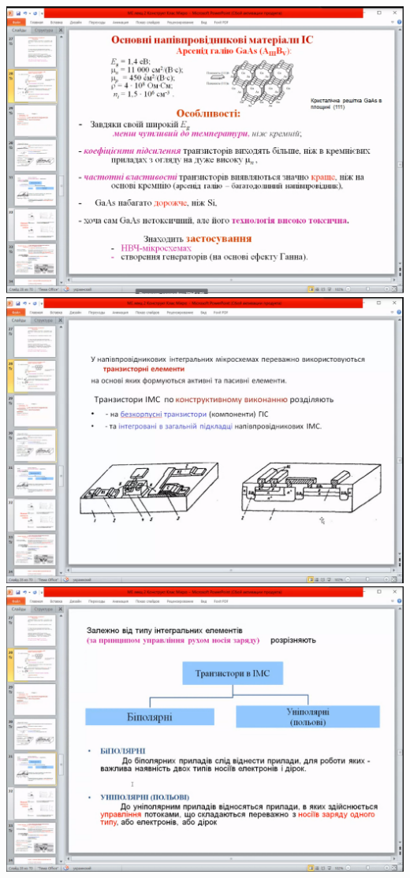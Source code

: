 \documentclass[a4paper,14pt]{extreport}
\begin{document}
\begin{center}
\includegraphics[scale = 0.75]{10.png}
\includegraphics[scale = 0.75]{11.png}
\includegraphics[scale = 0.75]{12.png}

\end{center}
\end{document}

